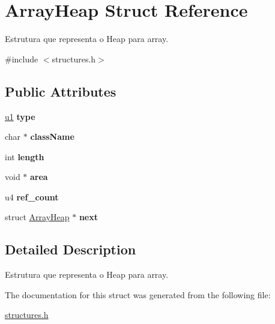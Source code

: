\hypertarget{structArrayHeap}{}\section{Array\+Heap Struct Reference}
\label{structArrayHeap}


Estrutura que representa o Heap para array.  




{\ttfamily \#include $<$structures.\+h$>$}

\subsection*{Public Attributes}
\begin{DoxyCompactItemize}
\item 
\mbox{\label{structArrayHeap_a2f757b0cd713760258f3841c9a2c88e1}} 
\mbox{\hyperlink{structures_8h_ad9f4cdb6757615aae2fad89dab3c5470}{u1}} {\bfseries type}
\item 
\mbox{\label{structArrayHeap_af1d36088b59701ee8c044db74fe1a015}} 
char $\ast$ {\bfseries class\+Name}
\item 
\mbox{\label{structArrayHeap_a0c4dc0ac3446f01c2e8a56f723156d65}} 
int {\bfseries length}
\item 
\mbox{\label{structArrayHeap_a69e46b5bbb2a5966a6c0d8e4aeb8bc34}} 
void $\ast$ {\bfseries area}
\item 
\mbox{\label{structArrayHeap_a6a7a745132bcbae936b49bdc3a0386cc}} 
u4 {\bfseries ref\+\_\+count}
\item 
\mbox{\label{structArrayHeap_a3b25cf7cee4def2e86c5592e4a22a1e7}} 
struct \mbox{\hyperlink{structArrayHeap}{Array\+Heap}} $\ast$ {\bfseries next}
\end{DoxyCompactItemize}


\subsection{Detailed Description}
Estrutura que representa o Heap para array. 

The documentation for this struct was generated from the following file\+:\begin{DoxyCompactItemize}
\item 
\mbox{\hyperlink{structures_8h}{structures.\+h}}\end{DoxyCompactItemize}
